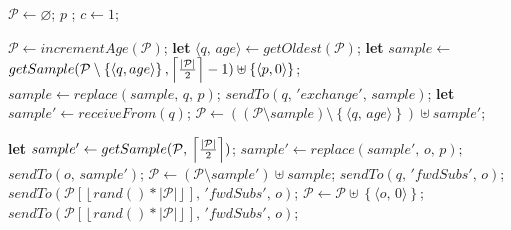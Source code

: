 \begin{algorithmic}[1]
  \Statex
  \initially
    \State $\mathcal{P} \leftarrow \varnothing$;
    \hfill {}
    \State $p$ ; \hfill {}
    \State $c \leftarrow 1$;
    \hfill {}

  \endInitially
  
  \act
     \hfill {}
    \State $\mathcal{P} \leftarrow incrementAge(\mathcal{P})$;
    \State \textbf{let} $ \langle q,\, age \rangle \leftarrow getOldest(\mathcal{P})$;
    \State \textbf{let} $sample \leftarrow $
    \Statex \hfill $getSample(\mathcal{P}\setminus\left\{\langle q, age\rangle\right\}, \left \lceil{|\mathcal{P}|\over{2}} \right \rceil-1) \uplus \left\{\langle p, 0 \rangle\right\}$; 
    \State $sample \leftarrow replace(sample,\,q,\,p)$;
    \State $sendTo(q,\, 'exchange',\, sample)$;
    \State \textbf{let} $sample'\leftarrow receiveFrom(q)$;
    \State $\mathcal{P} \leftarrow ((\mathcal{P} \setminus sample) \setminus \left\{\langle q,\, age \rangle \right\}) \uplus sample'$;
    \EndFunction
  \endAct
  
  \pas
     \hfill {}
    \State \textbf{let} $sample' \leftarrow getSample(\mathcal{P} ,\, \left\lceil |\mathcal{P}|\over{2} \right\rceil )$;
    \State $sample' \leftarrow replace(sample',\,o,\,p);$
    \State $sendTo(o ,\, sample')$;
    \State $\mathcal{P} \leftarrow (\mathcal{P} \setminus sample') \uplus
    sample$; 
    \EndFunction
    \Statex
     \hfill {}
    \State {}
    {$sendTo(q,\, 'fwdSubs',\, o)$;}
    \State {}
    {\INDSTATE $sendTo(\mathcal{P}[\left\lfloor rand()*
        |\mathcal{P}|\right\rfloor],\, 'fwdSubs',\, o)$;}
    \EndFunction
    \Statex
     \hfill {}
    \State $\mathcal{P} \leftarrow
    \mathcal{P}\uplus \left\{\langle o,\, 0 \rangle\right\}$;
    \Else
    \State $sendTo(\mathcal{P}[\left\lfloor rand()*
      |\mathcal{P}|\right\rfloor],\, 'fwdSubs',\, o)$;
    \EndIf
    \EndFunction
  \endPas
  
\end{algorithmic}
